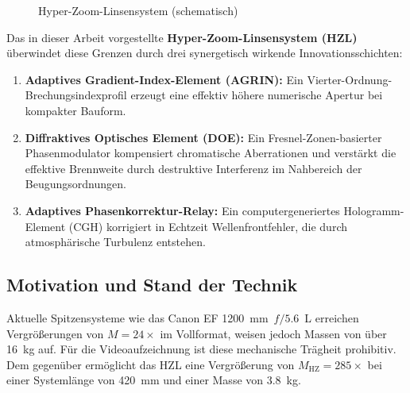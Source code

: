 ﻿\documentclass[12pt,a4paper]{article}
\theoremstyle{definition}
\newcommand{\HZ}{\mathrm{HZ}}
\begin{document}
\begin{figure}[h]
		\label{fig:hzl-system-schema}
		\caption{Hyper-Zoom-Linsensystem (schematisch)}
	\end{figure}
	
	Das in dieser Arbeit vorgestellte \textbf{Hyper-Zoom-Linsensystem (HZL)}
	überwindet diese Grenzen durch drei synergetisch wirkende Innovations\-schichten:
	
	\begin{enumerate}[label=(\roman*)]
		\item \textbf{Adaptives Gradient-Index-Element (AGRIN):} Ein Vierter-Ordnung-
		Brechungsindexprofil erzeugt eine effektiv höhere numerische Apertur bei
		kompakter Bauform.
		\item \textbf{Diffraktives Optisches Element (DOE):} Ein Fresnel-Zonen-basierter
		Phasenmodulator kompensiert chromatische Aberrationen und verstärkt die
		effektive Brennweite durch destruktive Interferenz im Nahbereich der
		Beugungsordnungen.
		\item \textbf{Adaptives Phasenkorrektur-Relay:} Ein computergeneriertes
		Hologramm-Ele\-ment (CGH) korrigiert in Echtzeit Wellenfrontfehler, die
		durch atmosphärische Turbulenz entstehen.
	\end{enumerate}
	
	\subsection{Motivation und Stand der Technik}
	
	Aktuelle Spitzensysteme wie das Canon EF \SI{1200}{\milli\metre}~$f/5.6$~L
	erreichen Vergrößerungen von $M = 24\times$ im Vollformat, weisen jedoch Massen
	von über \SI{16}{\kilogram} auf. Für die Videoaufzeichnung ist diese
	mechanische Trägheit prohibitiv. Dem gegenüber ermöglicht das HZL eine
	Vergrößerung von $M_\HZ = 285\times$ bei einer Systemlänge von
	\SI{420}{\milli\metre} und einer Masse von \SI{3.8}{\kilogram}.
	
\end{document}
